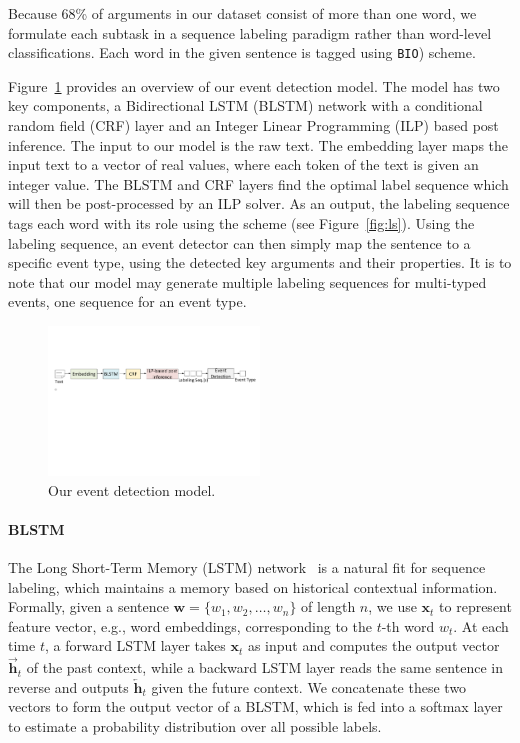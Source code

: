 Because 68\%  of  arguments in our dataset consist of more than one word, we formulate each subtask in a sequence labeling paradigm rather
than word-level classifications. Each word in the given sentence is tagged using \texttt{BIO}) scheme.


Figure~\ref{fig:model} provides an overview of our event detection model. The model has two key components, a Bidirectional LSTM (BLSTM)
network with a conditional random field (CRF) layer and an Integer Linear Programming (ILP) based post inference. The input to our model is
the raw text. The embedding layer maps the input text to a vector of real values, where each token of the text is given an integer value.
The BLSTM and CRF layers find the optimal label sequence which will then be post-processed by an ILP solver. As an output, the labeling
sequence tags each word with its role using the \BIO scheme (see Figure~\ref{fig:ls}).  Using the labeling sequence, an event detector can
then simply map the sentence to a specific event type, using the detected key arguments and their properties. It is to note that our model
may generate multiple labeling sequences for multi-typed events, one sequence for an event type.
\begin{figure}
  \centering
  \includegraphics[width=0.5\textwidth]{figs/model.pdf}
  \caption{Our event detection model.}\label{fig:model}
\end{figure}


\paragraph{BLSTM}
The Long Short-Term Memory (LSTM) network~\cite{hochreiter1997long} is a natural fit for sequence labeling, which maintains a memory based
on historical contextual information. Formally, given a sentence $\bm{w} = \{w_1, w_2, \dots, w_n\}$ of length $n$, we use $\textbf{x}_t$
to represent feature vector, e.g., word embeddings, corresponding to the $t$-th word $w_t$. At each time $t$, a forward LSTM layer takes
$\textbf{x}_t$ as input and computes the output vector $\overrightarrow{\textbf{h}}_t$ of the past context, while a backward LSTM layer
reads the same sentence in reverse and outputs $\overleftarrow{\textbf{h}}_t$ given the future context. We concatenate these two vectors to
form the output vector of a BLSTM, which is fed into a softmax layer to estimate a probability distribution over all possible labels.

